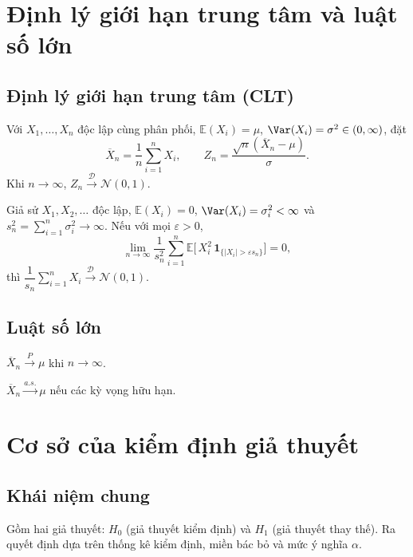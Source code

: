 \section{Định lý giới hạn trung tâm và luật số lớn}

\subsection{Định lý giới hạn trung tâm (CLT)}
\begin{dl}
Với $X_1,\ldots,X_n$ độc lập cùng phân phối, $\mathbb{E}(X_i)=\mu$, $\Var(X_i)=\sigma^2\in(0,\infty)$, đặt
\[
\overline{X}_n=\frac{1}{n}\sum_{i=1}^n X_i,\qquad Z_n=\frac{\sqrt{n}(\overline{X}_n-\mu)}{\sigma}.
\]
Khi $n\to\infty$, $Z_n\xrightarrow{\mathcal{D}}\mathcal{N}(0,1)$.
\end{dl}

\begin{dl}
Giả sử $X_1,X_2,\ldots$ độc lập, $\mathbb{E}(X_i)=0$, $\Var(X_i)=\sigma_i^2<\infty$ và $s_n^2=\sum_{i=1}^n\sigma_i^2\to\infty$. Nếu với mọi $\varepsilon>0$,
\[
\lim_{n\to\infty}\frac{1}{s_n^2}\sum_{i=1}^n \mathbb{E}\Big[\,X_i^2\,\mathbf{1}_{\{|X_i|>\varepsilon s_n\}}\Big]=0,
\]
thì $\dfrac{1}{s_n}\sum_{i=1}^n X_i\xrightarrow{\mathcal{D}}\mathcal{N}(0,1)$.
\end{dl}

\subsection{Luật số lớn}
\begin{dl}
$\overline{X}_n\xrightarrow{P}\mu$ khi $n\to\infty$.
\end{dl}
\begin{dl}
$\overline{X}_n\xrightarrow{a.s.}\mu$ nếu các kỳ vọng hữu hạn.
\end{dl}

\section{Cơ sở của kiểm định giả thuyết}

\subsection{Khái niệm chung}
\begin{dn}
Gồm hai giả thuyết: \textbf{$H_0$} (giả thuyết kiểm định) và \textbf{$H_1$} (giả thuyết thay thế). Ra quyết định dựa trên thống kê kiểm định, miền bác bỏ và mức ý nghĩa $\alpha$.
\end{dn}

